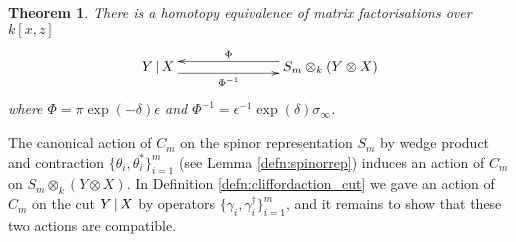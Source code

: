 \documentclass[english,letter paper,12pt,leqno]{article}
\newtheorem{theorem}{Theorem}[section]
\theoremstyle{example}
\numberwithin{equation}{section}
\def\ferm{\gamma}
\def\fermc{\gamma^\dagger}
\begin{document}
\begin{theorem}\label{theorem:htpy_equivalence_main} There is a homotopy equivalence of matrix factorisations over $k[x,z]$
\begin{equation}\label{eq:final_finite_model}
\xymatrix@C+4pc{
Y \l X \ar@<-1ex>[r]_-{\Phi^{-1}} & S_m \otimes_k ( Y \otimes X )\ar@<-1ex>[l]_-{\Phi}
}
\end{equation}
where $\Phi = \pi \exp(-\delta) \epsilon$ and $\Phi^{-1} = \epsilon^{-1} \exp(\delta) \sigma_\infty$.
\end{theorem}

The canonical action of $C_m$ on the spinor representation $S_m$ by wedge product and contraction $\{ \theta_i, \theta_i^* \}_{i=1}^m$ (see Lemma \ref{defn:spinorrep}) induces an action  of $C_m$ on $S_m \otimes_k ( Y \otimes X )$. In Definition \ref{defn:cliffordaction_cut} we gave an action of $C_m$ on the cut $Y \,|\, X$ by operators $\{ \ferm_i, \fermc_i \}_{i=1}^m$, and it remains to show that these two actions are compatible.
\end{document}
